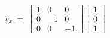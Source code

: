 \documentclass[preview]{standalone}
\begin{document}
\begin{align*}
v_x\ =\ \begin{bmatrix}
                        1 & 0 & 0\\
                        0 & -1 & 0\\
                        0 & 0 & -1
                        \end{bmatrix}\begin{bmatrix}
                        1\\
                        0\\
                        1
                        \end{bmatrix}\\
\end{align*}
\end{document}
